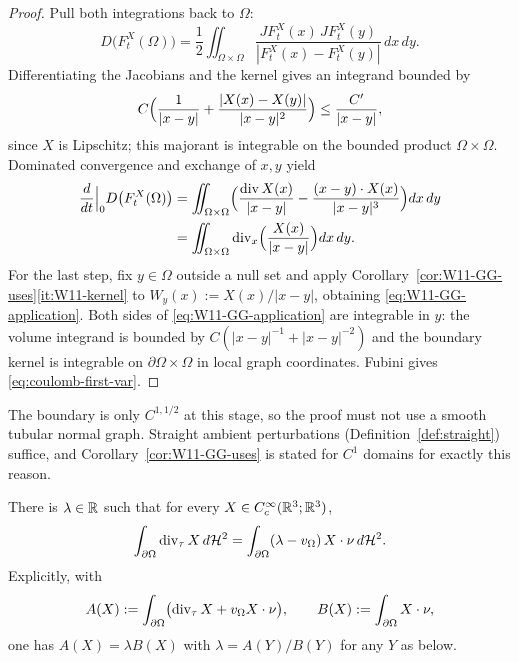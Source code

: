 \begin{proof}
Pull both integrations back to $\Omega$:
\[
  D\bigl(F^X_t(\Omega)\bigr)
  =\frac12\iint_{\Omega\times\Omega}
   \frac{JF^X_t(x)\,JF^X_t(y)}{|F^X_t(x)-F^X_t(y)|}\,dx\,dy .
\]
Differentiating the Jacobians and the kernel gives an integrand bounded by
\[
  C\Bigl(\frac1{|x-y|}+\frac{|X(x)-X(y)|}{|x-y|^2}\Bigr)
  \le\frac{C'}{|x-y|},
\]
since $X$ is Lipschitz; this majorant is integrable on the bounded product
$\Omega\times\Omega$.  Dominated convergence and exchange of $x,y$ yield
\begin{equation}\label{eq:coulomb-first-var-steps}
\begin{aligned}
  \frac{d}{dt}\Big|_0D\bigl(F^X_t(\Omega)\bigr)
  &=\iint_{\Omega\times\Omega}
    \Bigl(\frac{\operatorname{div} X(x)}{|x-y|}-\frac{(x-y)\cdot X(x)}{|x-y|^3}\Bigr)dx\,dy\\
  &=\iint_{\Omega\times\Omega}
    \operatorname{div}_x\Bigl(\frac{X(x)}{|x-y|}\Bigr)dx\,dy .
\end{aligned}
\end{equation}
For the last step, fix $y\in\Omega$ outside a null set and apply
Corollary~\ref{cor:W11-GG-uses}\ref{it:W11-kernel} to
$W_y(x):=X(x)/|x-y|$, obtaining \eqref{eq:W11-GG-application}.  Both sides of
\eqref{eq:W11-GG-application} are integrable in $y$: the volume integrand is
bounded by $C(|x-y|^{-1}+|x-y|^{-2})$ and the boundary kernel is integrable on
$\partial\Omega\times\Omega$ in local graph coordinates.  Fubini gives
\eqref{eq:coulomb-first-var}.
\end{proof}

\begin{fnote}\label{fnote:C1-suffices}
The boundary is only $C^{1,1/2}$ at this stage, so the proof must not use a
smooth tubular normal graph.  Straight ambient perturbations
(Definition~\ref{def:straight}) suffice, and
Corollary~\ref{cor:W11-GG-uses} is stated for $C^1$ domains for exactly this
reason.
\end{fnote}

\begin{theorem}\label{thm:constrained-first-var}
There is $\lambda\in\mathbb R$ such that for every $X\in C^\infty_c(\mathbb R^3;\mathbb R^3)$,
\begin{equation}\label{eq:weak-EL}
  \int_{\partial\Omega}\operatorname{div}_\tau X\,d\mathcal H^2
  =\int_{\partial\Omega}(\lambda-v_\Omega)\,X\cdot\nu\,d\mathcal H^2 .
\end{equation}
Explicitly, with
\[
  A(X):=\int_{\partial\Omega}\bigl(\operatorname{div}_\tau X+v_\Omega X\cdot\nu\bigr),
  \qquad
  B(X):=\int_{\partial\Omega}X\cdot\nu ,
\]
one has $A(X)=\lambda B(X)$ with $\lambda=A(Y)/B(Y)$ for any $Y$ as below.
\end{theorem}

